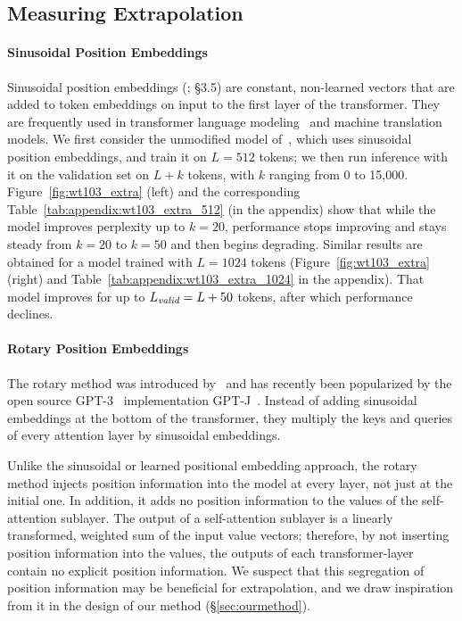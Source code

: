 



\subsection{Measuring Extrapolation}
\paragraph{Sinusoidal Position Embeddings}
Sinusoidal position embeddings (\citealp{vaswani}; \S 3.5) are constant, non-learned vectors that are added to token embeddings on input to the first layer of the transformer. They are frequently used in transformer language modeling~\citep{baevski,lewis2021base} and machine translation~\citep{vaswani,ott2018scaling} models. 
We first consider the unmodified model of~\cite{baevski}, which uses sinusoidal position embeddings, and train it on $L=512$ tokens; we then run inference with it on the validation set on $L+k$ tokens, with $k$ ranging from 0 to 15,000.
Figure~\ref{fig:wt103_extra} (left) and the corresponding Table~\ref{tab:appendix:wt103_extra_512} (in the appendix) show that while the model improves  perplexity up to $k=20$, performance stops improving and stays steady from $k=20$ to $k=50$ and then begins degrading. 
Similar results are obtained for a model trained with $L=1024$ tokens (Figure~\ref{fig:wt103_extra} (right) and Table~\ref{tab:appendix:wt103_extra_1024} in the appendix). That model improves for up to $L_{\textit{valid}} = L + 50$ tokens, after which performance declines. 

\paragraph{Rotary Position Embeddings}
The rotary method was introduced by~\cite{roformer} and has recently been popularized by the open source GPT-3~\citep{gpt3} implementation GPT-J~\citep{gpt-j}. Instead of adding sinusoidal embeddings at the bottom of the transformer, they multiply the keys and queries of every attention layer by sinusoidal embeddings. 

Unlike the sinusoidal or learned positional embedding approach, the rotary method injects position information into the model at every layer, not just at the initial one.  In addition, it adds no position information to the values of the self-attention sublayer. The output of a self-attention sublayer is a linearly transformed, weighted sum of the input value vectors; therefore, by not inserting position information into the values, the outputs of each transformer-layer contain no explicit position information. 
We suspect that this segregation of position information may be beneficial for extrapolation, and we draw inspiration from it in the design of our method (\S\ref{sec:ourmethod}).


